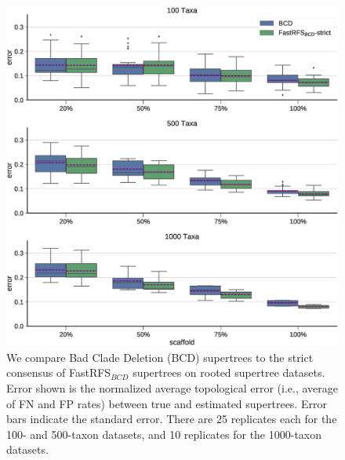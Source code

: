 \begin{figure}[ht]
  \centering
 \includegraphics[width=1\textwidth]{siesta-figs/best-supertree-comparison-mult_only}
\caption[Error rates for BCD and FastRFS$_{BCD}$+SIESTA (strict consensus) on simulated datasets]{We compare Bad Clade Deletion (BCD) supertrees to the strict consensus of FastRFS$_{BCD}$ supertrees on rooted supertree datasets.
Error shown is the normalized average topological error (i.e., average of FN and FP rates) between true and estimated supertrees.
Error bars indicate the standard error. 
There are 25 replicates each for the 100- and 500-taxon datasets, and 10 replicates for the 1000-taxon datasets.
  }\label{siesta::fig:supertree-bcd-error}
\end{figure}



